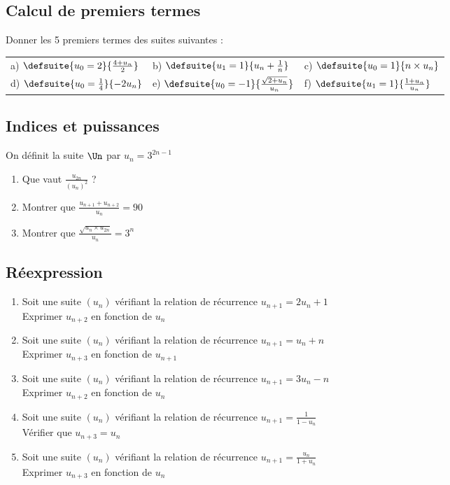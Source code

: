 \documentclass[oneside,12pt]{book}          %
\begin{document}
\subsection{Calcul de premiers termes}
Donner les 5 premiers termes des suites suivantes :\\
\renewcommand{\arraystretch}{2}
\begin{tabular}{p{} p{} p{}}

    a) $\defsuite{u_{0} = 2}{\frac{4+u_{n}}{2}} $
    &
    b) $\defsuite{u_{1} = 1}{u_n+\frac{1}{n}} $
    &
    c) $\defsuite{u_{0} = 1}{n\times u_n} $ \\

    d) $\defsuite{u_{0} = \frac{1}{4}}{-2u_n} $
    &
    e) $\defsuite{u_{0} = -1}{\frac{\sqrt{2+u_n}}{u_n}} $
    &
    f) $\defsuite{u_{1}=1}{\frac{1+u_{n}}{u_{n}}}$ 
\end{tabular}



\subsection{Indices et puissances}
On définit la suite $\Un$ par $u_n=3^{2n-1}$
\begin{enumerate}
	\item Que vaut $\frac{u_{2n}}{(u_n)^2}$ ?
	\item Montrer que $\frac{u_{n+1}+u_{n+2}}{u_n}=90$
	\item Montrer que $\frac{\sqrt{u_n\times u_{2n}}}{u_n}=3^n$
\end{enumerate}


\subsection{Réexpression}
\begin{enumerate}
    \item Soit une suite $(u_n)$ vérifiant la relation de récurrence $u_{n+1} = 2u_n + 1$\\
    Exprimer $u_{n+2}$ en fonction de $u_n$
    \item Soit une suite $(u_n)$ vérifiant la relation de récurrence  $u_{n+1} = u_n + n$    \\
    Exprimer $u_{n+3}$ en fonction de $u_{n+1}$
    \item Soit une suite $(u_n)$ vérifiant la relation de récurrence  $u_{n+1} = 3u_n - n$    \\
    Exprimer $u_{n+2}$ en fonction de $u_n$
    \item Soit une suite $(u_n)$ vérifiant la relation de récurrence  $u_{n+1} = \frac{1}{1-u_n}$\\
    Vérifier que $u_{n+3}=u_n$
    \item Soit une suite $(u_n)$ vérifiant la relation de récurrence $u_{n+1}=\frac{u_n}{1+u_n}$\\
    Exprimer $u_{n+3}$ en fonction de $u_n$
\end{enumerate}
\end{document}
